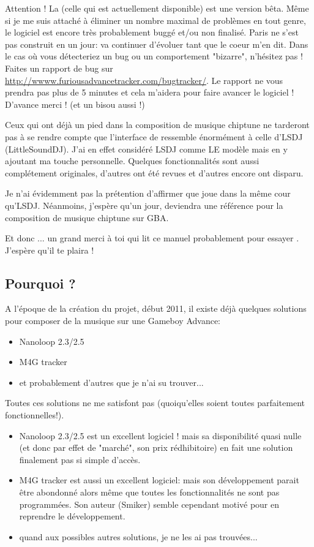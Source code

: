 \documentclass[12pt,a4paper]{article}
\begin{document}
    Attention ! La \fatversion (celle qui est actuellement disponible) est une version bêta. Même si je me suis attaché à éliminer un nombre maximal de problèmes en tout genre, le logiciel est encore très probablement buggé et/ou non finalisé. Paris ne s'est pas construit en un jour: \FAT va continuer d'évoluer tant que le coeur m'en dit. Dans le cas où vous détecteriez un bug ou un comportement "bizarre", n'hésitez pas ! Faites un rapport de bug sur \url{http://wwww.furiousadvancetracker.com/bugtracker/}. Le rapport ne vous prendra pas plus de 5 minutes et cela m'aidera pour faire avancer le logiciel ! D'avance merci ! (et un bisou aussi !)\medskip
    
    Ceux qui ont déjà un pied dans la composition de musique chiptune ne tarderont pas à se rendre compte que l'interface de \FAT ressemble énormément à celle d'LSDJ (LittleSoundDJ). J'ai en effet considéré LSDJ comme LE modèle mais en y ajoutant ma touche personnelle. Quelques fonctionnalités sont aussi complétement originales, d'autres ont été revues et d'autres encore ont disparu.\medskip
    
    Je n'ai évidemment pas la prétention d'affirmer que \FAT joue dans la même cour qu'LSDJ. Néanmoins, j'espère qu'un jour, \FAT deviendra une référence pour la composition de musique chiptune sur GBA.\medskip
    
    Et donc ... un grand merci à toi qui lit ce manuel probablement pour essayer \FAT. J'espère qu'il te plaira !
  
    \subsection{Pourquoi \FAT ?}
    A l'époque de la création du projet, début 2011, il existe déjà quelques solutions pour composer de la musique sur une Gameboy Advance:\medskip
    
    \begin{itemize}
        \item{Nanoloop 2.3/2.5}
        \item{M4G tracker}
        \item{et probablement d'autres que je n'ai su trouver...}
    \end{itemize}\medskip
    
    Toutes ces solutions ne me satisfont pas (quoiqu'elles soient toutes parfaitement fonctionnelles!).\medskip
    
    \begin{itemize}
        \item{Nanoloop 2.3/2.5 est un excellent logiciel ! mais sa disponibilité quasi nulle (et donc par effet de "marché", son prix rédhibitoire) en fait une solution finalement pas si simple d'accès.}
        \item{M4G tracker est aussi un excellent logiciel: mais son développement parait être abondonné alors même que toutes les fonctionnalités ne sont pas programmées. Son auteur (Smiker) semble cependant motivé pour en reprendre le développement.}
        \item{quand aux possibles autres solutions, je ne les ai pas trouvées...}
    \end{itemize}\medskip
    
\end{document}
